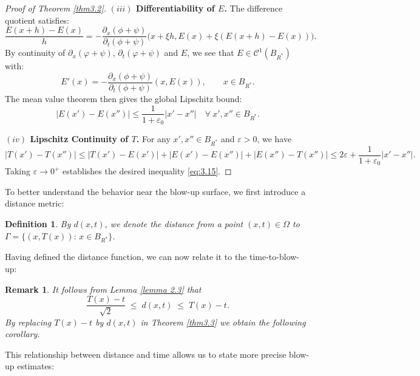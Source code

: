 \documentclass[
  sn-mathphys-num,
  colorlinks,
  linkcolor=darkmagenta,
  citecolor=rufous,
  urlcolor=zaffre,
  hypertexnames=false
]{sn-jnl}
\numberwithin{equation}{section}
\newtheorem{remark}[theorem]{Remark}%
\newtheorem{definition}{Definition}[section]%
\begin{document}
\begin{proof}[Proof of Theorem \ref{thm3.2}]
\medskip
\noindent\textbf{$(iii)$ Differentiability of $E$.}
The difference quotient satisfies:
$$
\frac{E(x + h) - E(x)}{h} = -\frac{\partial_x(\phi + \psi)}{\partial_t(\phi + \psi)}\big(x + \xi h, E(x) + \xi(E(x + h) - E(x))\big).
$$
By continuity of $\partial_x(\varphi + \psi)$, $\partial_t(\varphi + \psi)$ and $E$, we see that 
\(
E \in \mathcal{C}^{1}(B_{R^*})
\)
 with:
$$
E'(x) = -\frac{\partial_x(\phi + \psi)}{\partial_t(\phi + \psi)}(x, E(x)), \qquad x\in B_{R^*}.
$$
The mean value theorem then gives the global Lipschitz bound:
\begin{equation}
\label{eq:3.17}
|E(x') - E(x'')| \leq \frac{1}{1 + \varepsilon_0} |x' - x''| \quad \forall \ x', x'' \in B_{R^*}.
\end{equation}

\medskip
\noindent\textbf{$(iv)$ Lipschitz Continuity of $T$.}
For any $x', x'' \in B_{R^*}$ and $\varepsilon > 0$, we have
$$
|T(x') - T(x'')| \leq |T(x') - E(x')| + |E(x') - E(x'')| + |E(x'') - T(x'')| \leq 2\varepsilon + \frac{1}{1 + \varepsilon_0} |x' - x''|.
$$
Taking $\varepsilon \to 0^+$ establishes the desired inequality \eqref{eq:3.15}.
\end{proof}








To better understand the behavior near the blow-up surface, we first introduce a distance metric:

\begin{definition}\label{def:3.3}
By $d(x,t)$, we denote the distance from a point $(x,t)\in\Omega$ to $\Gamma=\{(x,T(x)):\,x\in B_{R^*}\}$.
\end{definition}

Having defined the distance function, we can now relate it to the time-to-blow-up:

\begin{remark}\label{rem:3.4}
\rm It follows from Lemma \ref{lemma 2.3} that
$$
\frac{T(x)-t}{\sqrt{2}}\;\leq\;d(x,t)\;\leq\;T(x)-t.
$$
By replacing $T(x)-t$ by $d(x,t)$ in Theorem \ref{thm3.3} we obtain the following corollary.
\end{remark}

This relationship between distance and time allows us to state more precise blow-up estimates:
\end{document}
